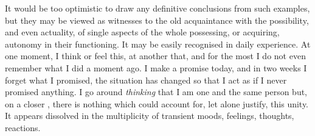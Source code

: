 It would be too optimistic to draw any definitive conclusions from such
examples, but they may be viewed as witnesses to the old acquaintance with the
possibility, and even actuality, of single aspects of the whole possessing, or
acquiring, autonomy in their functioning.  It may be easily recognised in daily
experience.  At one moment, I think or feel this, at another that, and for the
most I do not even remember what I did a moment ago.  I make a promise today,
and in two weeks I forget what I promised, the situation has changed so that I
act as if I never promised anything.  I go around {\em thinking} that I am one
and the same person but, on a closer , there is nothing
 which could account for, let alone justify, this unity. It appears
dissolved in the multiplicity of transient moods, feelings, thoughts, reactions.


